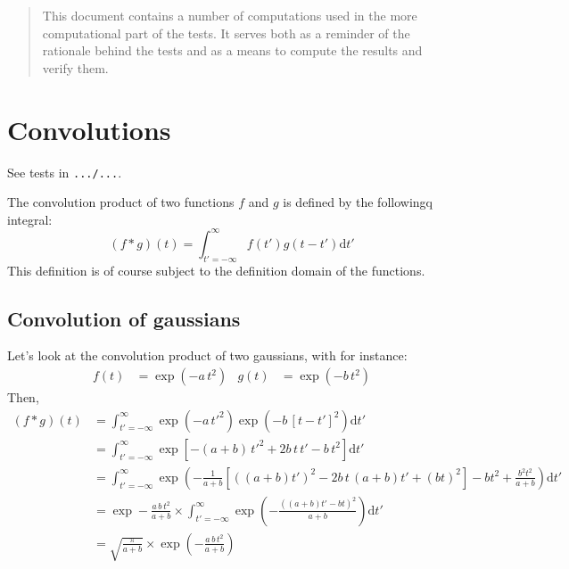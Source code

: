 \documentclass{article}
\newcommand{\dd}{\mathrm{d}}
\newcommand{\pa}[1]{\left(#1\right)}
\newcommand{\pab}[1]{\left[#1\right]}
\begin{document}
\begin{abstract}
  This document contains a number of computations used in the more
  computational part of the tests. It serves both as a reminder of the
  rationale behind the tests and as a means to compute the results and
  verify them.
\end{abstract}

\section{Convolutions}

See tests in \texttt{.../...}.

The convolution product of two functions $f$ and $g$ is defined by the followingq
integral:
%
\begin{equation}
  (f\mathop{*}g)(t) = \int_{t' = -\infty}^{\infty} f(t') g(t-t') \dd t'
  \label{eq:convolution}
\end{equation}
%
This definition is of course subject to the definition domain of the
functions.

\subsection{Convolution of gaussians}

Let's look at the convolution product of two gaussians, with for
instance:
%
\begin{align}
  f(t) &= \exp \pa{-a\,t^2} &
  g(t) &= \exp \pa{-b\,t^2}
\end{align}
%
Then,
\begin{align}
  (f\mathop{*}g)(t) &=
  \int_{t' = -\infty}^{\infty}
  \exp \pa{-a\,t'^2}\exp \pa{-b\,[t-t']^2} \dd t'\\[3mm]
  &= 
  \int_{t' = -\infty}^{\infty}
  \exp \pab{-\pa{a+b}\,t'^2 + 2b\,t\,t' - b\,t^2} \dd t'\\[3mm]
  &= 
  \int_{t' = -\infty}^{\infty}
  \exp
  \pa{-\frac{1}{a+b}
    \pab{\pa{(a+b)t'}^2 - 2b\,t\,\pa{a+b}t' + \pa{b t}^2}
    - bt^2 + \frac{b^2t^2}{a+b}
  } \dd t'\\[3mm]
  &=
  \exp -\frac{a\,b\,t^2}{a+b} \times
  \int_{t' = -\infty}^{\infty}
  \exp
  \pa{-\frac{\pa{(a+b)t' - bt}^2}{a+b}}
  \dd t'\\[3mm]
  &= \sqrt{\frac{\pi}{a+b}} \times 
  \exp \pa{-\frac{a\,b\,t^2}{a+b}}
\end{align}
\end{document}
